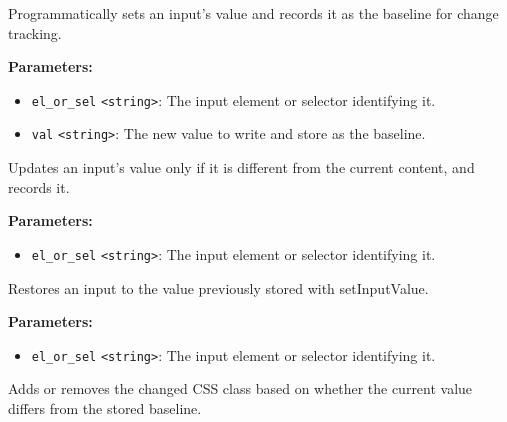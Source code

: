\documentclass[12pt,a4paper]{article}
\begin{document}
\noindent Programmatically sets an input’s value and records it as the baseline for change tracking.

\vspace{5mm}
\noindent {}


\noindent \textbf{Parameters:}
\begin{itemize}
  \item \texttt{el\_or\_sel} \texttt{<string>}: The input element or selector identifying it.
  \item \texttt{val} \texttt{<string>}: The new value to write and store as the baseline.
\end{itemize}

\noindent Updates an input’s value only if it is different from the current content, and records it.

\vspace{5mm}
\noindent {}


\noindent \textbf{Parameters:}
\begin{itemize}
  \item \texttt{el\_or\_sel} \texttt{<string>}: The input element or selector identifying it.
\end{itemize}

\noindent Restores an input to the value previously stored with \textasciigrave{}setInputValue\textasciigrave{}.

\vspace{5mm}
\noindent {}


\noindent \textbf{Parameters:}
\begin{itemize}
  \item \texttt{el\_or\_sel} \texttt{<string>}: The input element or selector identifying it.
\end{itemize}

\noindent Adds or removes the \textasciigrave{}changed\textasciigrave{} CSS class based on whether the current value differs from the stored baseline.

\vspace{5mm}
\noindent {}
\end{document}
